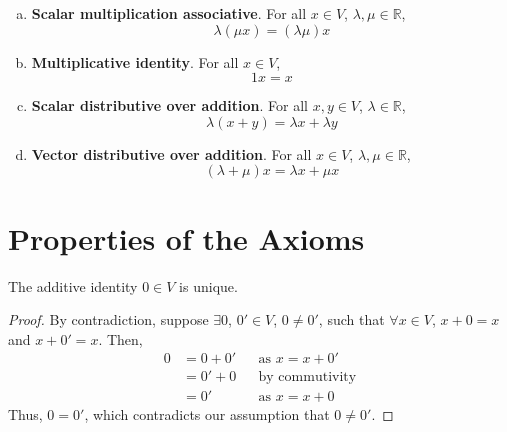 \documentclass[letterpaper,12pt]{article}
\begin{document}
\begin{definition}
\begin{enumerate}[(a)]
    \item \textbf{Scalar multiplication associative}. For all $x \in V$, $\lambda, \mu \in \mathbb{R}$,
    \begin{equation*}
        \lambda(\mu x) = (\lambda \mu) x
    \end{equation*}
    \item \textbf{Multiplicative identity}. For all $x \in V$,
    \begin{equation*}
        1x = x
    \end{equation*}
    \item \textbf{Scalar distributive over addition}. For all $x, y \in V$, $\lambda \in \mathbb{R}$,
    \begin{equation*}
        \lambda(x + y) = \lambda x + \lambda y
    \end{equation*}
    \item \textbf{Vector distributive over addition}. For all $x \in V$, $\lambda, \mu \in \mathbb{R}$,
    \begin{equation*}
        (\lambda + \mu)x = \lambda x + \mu x
    \end{equation*}
\end{enumerate}
\end{definition}

\section*{Properties of the Axioms}

\begin{theorem}
The additive identity $0 \in V$ is unique.
\end{theorem}
\begin{proof}
By contradiction, suppose $\exists 0$, $0' \in V$, $0 \neq 0'$, such that $\forall x \in V$, $x + 0 = x$ and $x + 0' = x$. Then,
\begin{align*}
    0 & = 0 + 0' && \text{as $x = x + 0'$} \\
    & = 0' + 0 && \text{by commutivity} \\
    & = 0' && \text{as $x = x + 0$}
\end{align*}
Thus, $0 = 0'$, which contradicts our assumption that $0 \neq 0'$.
\end{proof}
\end{document}
